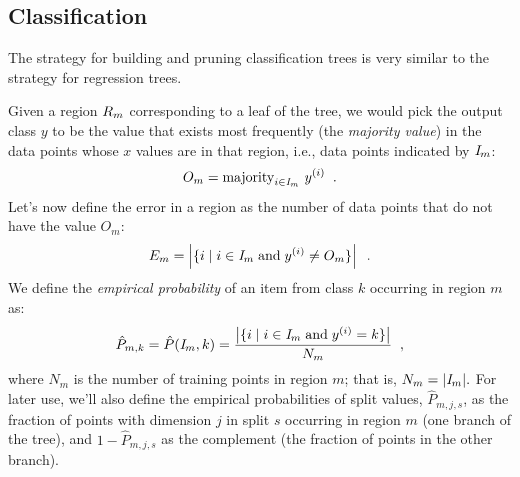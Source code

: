 \subsection{Classification}

The strategy for building and pruning classification trees is very
similar to the strategy for regression trees.

Given a region $R_m$ corresponding to a leaf of the tree, we would
pick the output class $y$ to be the value that exists most frequently
(the {\em majority value}) in the data points whose $x$ values are in
that region, i.e., data points indicated by ${\emph I}_m$:
$$O_m = {\rm majority}_{i \in {\emph I}_m}~y^{(i)}\;\;.$$
Let's now define the error in a region as the number of data points that do not
have the value $O_m$:
$$E_m = \left|\{i \mid i \in {\emph I}_m \;\text{and}\; y^{(i)} \not
  = O_m\}\right|\;\;.$$
We define the {\em empirical probability} of an item from class $k$
occurring in region $m$ as:
\[\hat{P}_{m,k} = \hat{P}({\emph I}_m,k) = \frac{\left|\{i \mid i \in {\emph I}_m
    \;\text{and}\; y^{(i)} = k\}\right|}{N_m}\;\;,\] where
$N_m$ is the number of training points in region $m$; that is, $N_m = |{\emph I}_m|.$
For later use, we'll also define the empirical probabilities of split values,
$\hat{P}_{m,j,s}$, as the fraction of points with dimension $j$ in
split $s$ occurring in region $m$ (one branch of the tree), and $1 -
  \hat{P}_{m,j,s}$ as the complement (the fraction of points in the
other branch).

